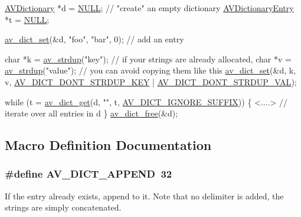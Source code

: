 \begin{DoxyCode}
\hyperlink{group__lavu__dict_ga1d7cc0833bee918994a600556410315f}{AVDictionary} *d = \hyperlink{getopt1_8c_a070d2ce7b6bb7e5c05602aa8c308d0c4}{NULL};           \textcolor{comment}{// "create" an empty dictionary}
\hyperlink{struct_a_v_dictionary_entry}{AVDictionaryEntry} *t = \hyperlink{getopt1_8c_a070d2ce7b6bb7e5c05602aa8c308d0c4}{NULL};

\hyperlink{group__lavu__dict_ga8d9c2de72b310cef8e6a28c9cd3acbbe}{av\_dict\_set}(&d, \textcolor{stringliteral}{"foo"}, \textcolor{stringliteral}{"bar"}, 0); \textcolor{comment}{// add an entry}

\textcolor{keywordtype}{char} *k = \hyperlink{group__lavu__mem_ga7c352f4cff02184f005323691375fea9}{av\_strdup}(\textcolor{stringliteral}{"key"});       \textcolor{comment}{// if your strings are already allocated,}
\textcolor{keywordtype}{char} *v = \hyperlink{group__lavu__mem_ga7c352f4cff02184f005323691375fea9}{av\_strdup}(\textcolor{stringliteral}{"value"});     \textcolor{comment}{// you can avoid copying them like this}
\hyperlink{group__lavu__dict_ga8d9c2de72b310cef8e6a28c9cd3acbbe}{av\_dict\_set}(&d, k, v, \hyperlink{group__lavu__dict_gacb0ce4f20c15bf174f93590ace0fc8fd}{AV\_DICT\_DONT\_STRDUP\_KEY} | 
      \hyperlink{group__lavu__dict_ga7a9a991cb7837b10ffd44725263de425}{AV\_DICT\_DONT\_STRDUP\_VAL});

\textcolor{keywordflow}{while} (t = \hyperlink{group__lavu__dict_ga8140aee3afe5d5ccdf2d4a5eabb4a710}{av\_dict\_get}(d, \textcolor{stringliteral}{""}, t, \hyperlink{group__lavu__dict_ga341bbd1ea599dfb0510f419e5272fecc}{AV\_DICT\_IGNORE\_SUFFIX})) \{
    <....>                             \textcolor{comment}{// iterate over all entries in d}
\}
\hyperlink{group__lavu__dict_ga1bafd682b1fbb90e48a4cc3814b820f7}{av\_dict\_free}(&d);
\end{DoxyCode}
 

\subsection{Macro Definition Documentation}
\subsubsection[{\texorpdfstring{A\+V\+\_\+\+D\+I\+C\+T\+\_\+\+A\+P\+P\+E\+ND}{AV_DICT_APPEND}}]{\setlength{\rightskip}{0pt plus 5cm}\#define A\+V\+\_\+\+D\+I\+C\+T\+\_\+\+A\+P\+P\+E\+ND~32}\hypertarget{group__lavu__dict_ga64018c01d1e8c44d1d8c03dfb099f2c2}{}\label{group__lavu__dict_ga64018c01d1e8c44d1d8c03dfb099f2c2}
If the entry already exists, append to it. Note that no delimiter is added, the strings are simply concatenated. 

